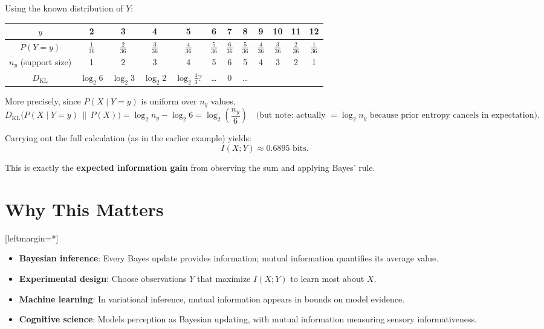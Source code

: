 \documentclass[11pt]{article}
\begin{document}
Using the known distribution of \(Y\):
\begin{center}
\begin{tabular}{c|ccccccccccc}
\(y\) & 2 & 3 & 4 & 5 & 6 & 7 & 8 & 9 & 10 & 11 & 12 \\
\midrule
\(P(Y=y)\) & \(\frac{1}{36}\) & \(\frac{2}{36}\) & \(\frac{3}{36}\) & \(\frac{4}{36}\) & \(\frac{5}{36}\) & \(\frac{6}{36}\) & \(\frac{5}{36}\) & \(\frac{4}{36}\) & \(\frac{3}{36}\) & \(\frac{2}{36}\) & \(\frac{1}{36}\) \\
\(n_y\) (support size) & 1 & 2 & 3 & 4 & 5 & 6 & 5 & 4 & 3 & 2 & 1 \\
\(D_{\mathrm{KL}}\) & \(\log_2 6\) & \(\log_2 3\) & \(\log_2 2\) & \(\log_2 \tfrac{4}{3}\)? & \dots & 0 & \dots & & & &
\end{tabular}
\end{center}

More precisely, since \(P(X \mid Y = y)\) is uniform over \(n_y\) values,
\[
D_{\mathrm{KL}}\big(P(X \mid Y = y) \,\|\, P(X)\big) = \log_2 n_y - \log_2 6 = \log_2 \left( \frac{n_y}{6} \right) \quad \text{(but note: actually } = \log_2 n_y \text{ because prior entropy cancels in expectation)}.
\]

Carrying out the full calculation (as in the earlier example) yields:
\[
I(X;Y) \approx 0.6895 \text{ bits}.
\]

This is exactly the \textbf{expected information gain} from observing the sum and applying Bayes' rule.

\section*{Why This Matters}

[leftmargin=*]\begin{itemize}
    \item \textbf{Bayesian inference}: Every Bayes update provides information; mutual information quantifies its average value.
    \item \textbf{Experimental design}: Choose observations \(Y\) that maximize \(I(X;Y)\) to learn most about \(X\).
    \item \textbf{Machine learning}: In variational inference, mutual information appears in bounds on model evidence.
    \item \textbf{Cognitive science}: Models perception as Bayesian updating, with mutual information measuring sensory informativeness.
\end{itemize}
\end{document}
